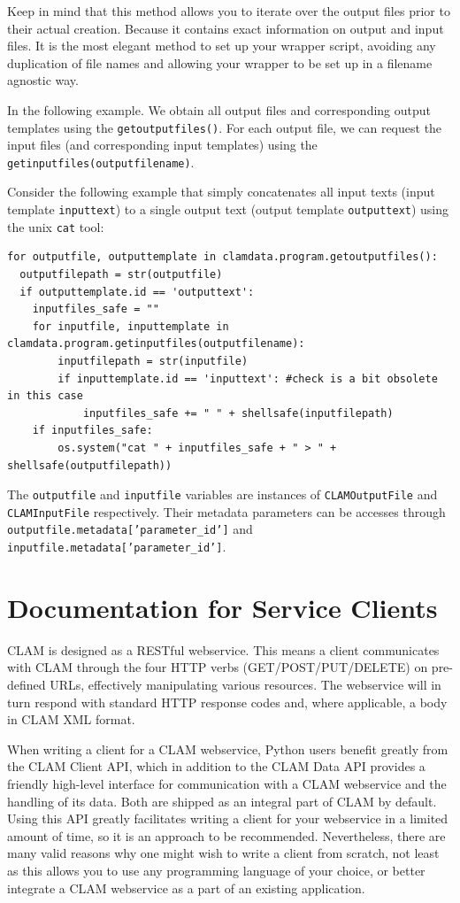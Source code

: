 \documentclass[a4paper,12pt,twoside,openright]{report}
\begin{document}
Keep in mind that this method allows you to iterate over the output files prior
to their actual creation. Because it contains exact information on output and
input files. It is the most elegant method to set up your wrapper script,
avoiding any duplication of file names and allowing your wrapper to be set up
in a filename agnostic way.

In the following example. We obtain all output files and corresponding
output templates using the \texttt{getoutputfiles()}. For each output file, we can
request the input files (and corresponding input templates) using the
\texttt{getinputfiles(outputfilename)}. 

Consider the following example that simply concatenates all input texts (input template
\texttt{inputtext}) to a single output text (output template
\texttt{outputtext}) using the unix \texttt{cat} tool:

{ \small
\begin{verbatim}
for outputfile, outputtemplate in clamdata.program.getoutputfiles():
  outputfilepath = str(outputfile)
  if outputtemplate.id == 'outputtext':
    inputfiles_safe = ""
    for inputfile, inputtemplate in clamdata.program.getinputfiles(outputfilename):
        inputfilepath = str(inputfile)
        if inputtemplate.id == 'inputtext': #check is a bit obsolete in this case
            inputfiles_safe += " " + shellsafe(inputfilepath) 
    if inputfiles_safe:
        os.system("cat " + inputfiles_safe + " > " + shellsafe(outputfilepath))
\end{verbatim}}

The \texttt{outputfile} and \texttt{inputfile} variables are instances of
\texttt{CLAMOutputFile} and \texttt{CLAMInputFile} respectively. Their metadata
parameters can be accesses through \texttt{outputfile.metadata['parameter\_id']}
and \texttt{inputfile.metadata['parameter\_id']}. 


\chapter{Documentation for Service Clients}

CLAM is designed as a RESTful webservice. This means a client communicates with
CLAM through the four HTTP verbs (GET/POST/PUT/DELETE) on pre-defined URLs,
effectively manipulating various resources. The webservice will in turn respond
with standard HTTP response codes and, where applicable, a body in CLAM XML format.

When writing a client for a CLAM webservice, Python users benefit greatly from
the CLAM Client API, which in addition to the CLAM Data API provides a friendly
high-level interface for communication with a CLAM webservice and the handling
of its data. Both are shipped as an integral part of CLAM by default. Using
this API greatly facilitates writing a client for your webservice in a limited
amount of time, so it is an approach to be recommended. Nevertheless, there are
many valid reasons why one might wish to write a client from scratch, not least as
this allows you to use any programming language of your choice, or better
integrate a CLAM webservice as a part of an existing application.
\end{document}
